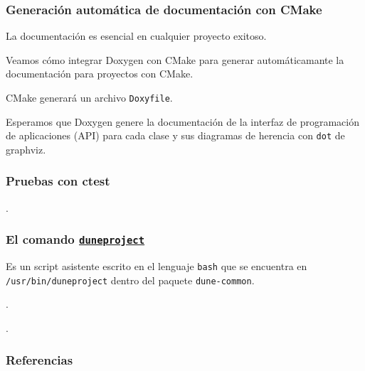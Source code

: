\begin{frame}[fragile]
	\frametitle{Generación automática de documentación con CMake}
	La documentación es esencial en cualquier proyecto exitoso.

	Veamos cómo integrar Doxygen con CMake para generar
	automáticamante la documentación para proyectos con CMake.

	CMake generará un archivo \lstinline{Doxyfile}.

	Esperamos que Doxygen genere la documentación de la interfaz de
	programación de aplicaciones (API) para cada clase y sus
	diagramas de herencia con \lstinline{dot} de graphviz.
\end{frame}

\begin{frame}[fragile]
	\frametitle{Pruebas con ctest}
	.
\end{frame}



\begin{frame}[fragile]
	\frametitle{El comando \href{https://gitlab.dune-project.org/core/dune-common/-/raw/master/bin/duneproject}{\lstinline{duneproject}}}

	Es un script asistente escrito en el lenguaje \lstinline{bash}
	que se encuentra en \lstinline{/usr/bin/duneproject}
	dentro del paquete \lstinline{dune-common}.
\end{frame}

\begin{frame}
	.
\end{frame}

\begin{frame}
	.
\end{frame}

\begin{frame}\transblindsvertical
	\frametitle{Referencias}
\end{frame}


